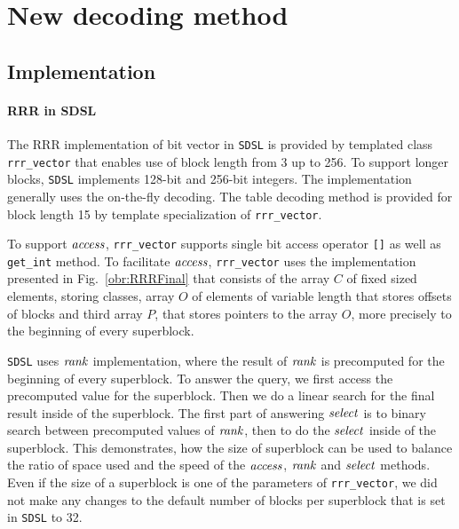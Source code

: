\section{New decoding method}

\subsection{Implementation}

\paragraph{RRR in SDSL}

The RRR implementation of bit vector in \texttt{SDSL} is provided by templated class \verb'rrr_vector'
that enables use of block length from 3 up to 256. To support longer blocks,
\texttt{SDSL} implements 128-bit and 256-bit integers. The implementation generally uses the
on-the-fly decoding. The table decoding method is provided for block length 15 by template specialization
of \verb'rrr_vector'.

To support $\mathit{access}$, \verb'rrr_vector' supports single bit access operator \verb'[]' as well
as \verb'get_int' method. To facilitate $\mathit{access}$, \verb'rrr_vector' uses the implementation
presented in Fig.~\ref{obr:RRRFinal} that consists of the array $C$ of fixed sized elements, storing
classes, array $O$ of elements of variable length that stores offsets of blocks and third array $P$,
that stores pointers to the array $O$, more precisely to the beginning of every superblock.

\texttt{SDSL} uses $\mathit{rank}$ implementation, where the result of $\mathit{rank}$ is precomputed for the beginning
of every superblock. To answer the query, we first access the precomputed value for the superblock. Then
we do a linear search for the final result inside of the superblock. The first part of answering $\mathit{select}$
is to binary search between precomputed values of $\mathit{rank}$, then to do the $\mathit{select}$ inside of the superblock.
This demonstrates, how the size of superblock can be used to balance the ratio of space used and the speed
of the $\mathit{access}$, $\mathit{rank}$ and $\mathit{select}$ methods. Even if the size of a superblock is one of the parameters
of \verb'rrr_vector', we did not make any changes to the default number of blocks per superblock that
is set in \texttt{SDSL} to 32.

